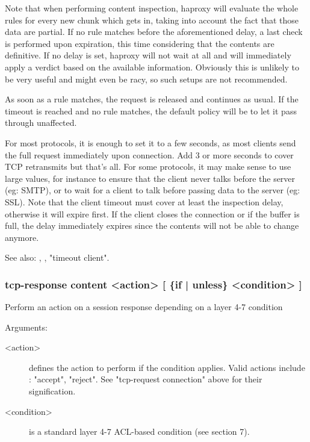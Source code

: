   Note that when performing content inspection, haproxy will evaluate the whole
  rules for every new chunk which gets in, taking into account the fact that
  those data are partial. If no rule matches before the aforementioned delay,
  a last check is performed upon expiration, this time considering that the
  contents are definitive. If no delay is set, haproxy will not wait at all
  and will immediately apply a verdict based on the available information.
  Obviously this is unlikely to be very useful and might even be racy, so such
  setups are not recommended.

  As soon as a rule matches, the request is released and continues as usual. If
  the timeout is reached and no rule matches, the default policy will be to let
  it pass through unaffected.

  For most protocols, it is enough to set it to a few seconds, as most clients
  send the full request immediately upon connection. Add 3 or more seconds to
  cover TCP retransmits but that's all. For some protocols, it may make sense
  to use large values, for instance to ensure that the client never talks
  before the server (eg: SMTP), or to wait for a client to talk before passing
  data to the server (eg: SSL). Note that the client timeout must cover at
  least the inspection delay, otherwise it will expire first. If the client
  closes the connection or if the buffer is full, the delay immediately expires
  since the contents will not be able to change anymore.

  See also: , ,
             "timeout client".


\subsubsection[tcp-response content]{tcp-response content <action> [ \{if | unless\} <condition> ]}


  Perform an action on a session response depending on a layer 4-7 condition


  Arguments:
  \begin{description}
  \item[<action>] defines the action to perform if the condition applies. Valid
                actions include : "accept", "reject".
                See "tcp-request connection" above for their signification.

  \item[<condition>] is a standard layer 4-7 ACL-based condition (see section 7).
  \end{description}

